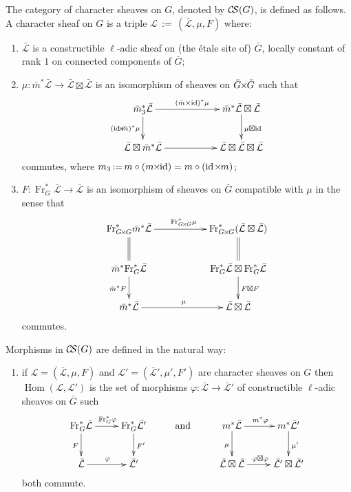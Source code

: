 \documentclass[11pt]{amsart}
\makeatletter
\theoremstyle{plain}
\theoremstyle{definition}
\theoremstyle{remark}
\newcommand{\Frob}{{\operatorname{Fr}}}
\DeclareMathOperator{\Hom}{Hom}
\DeclareMathOperator{\id}{id}
\newcommand{\cdef}[1]{{{\color{cyan}#1}\index{#1}}}
\newcommand{\ceq}{{\, :=\, }}
\newcommand{\cs}[1]{{\mathcal{#1}}}
\newcommand{\gcs}[1]{{\mathcal{\bar #1}}}
\newcommand{\CS}{{\mathcal{C\hskip-1.8pt S}}}
\newcommand{\labitem}[2]{%
\def\@itemlabel{\textbf{#1}}
\item
\def\@currentlabel{#1}\label{#2}}
\newcommand{\tighttimes}{\hskip-1pt\times\hskip-1pt}
\newcommand{\tightertimes}{\hskip-3pt\times\hskip-3pt}
\makeatother
\begin{document}
The category of character sheaves on $G$, denoted by \cdef{$\CS(G)$}, is defined as follows.
A \cdef{character sheaf} on $G$ is a triple $\cs{L}\ceq (\gcs{L},\mu,F)$ where: 
\begin{enumerate}
\labitem{(CS.0)}{CS.0} $\gcs{L}$ is a constructible $\ell$-adic sheaf on (the \'etale site of) ${\bar G}$, locally constant of rank $1$ on connected components of ${\bar G}$; 
\labitem{(CS.1)}{CS.1} $\mu: {\bar m}^* \gcs{L} \to  \gcs{L}\boxtimes \gcs{L}$ is an isomorphism of sheaves on ${\bar G}\tightertimes {\bar G}$ such that
\[
\xymatrix{
{\bar m}_3^*\gcs{L} \ar[rr]^{({\bar m}\times \id)^*\mu} \ar[d]_{(\id\tightertimes {\bar m})^*\mu}   &&  {\bar m}^*\gcs{L}\boxtimes \gcs{L} \ar[d]^{\mu \boxtimes \id} \\
\gcs{L} \boxtimes {\bar m}^* \gcs{L} \ar[rr] & &  \gcs{L} \boxtimes\gcs{L} \boxtimes \gcs{L}\\
}
\]
commutes, where $m_3 \ceq m\circ (m\tightertimes\id) = m\circ (\id\tighttimes m)$;
\labitem{(CS.2)}{CS.2} $F : \Frob_{G}^* \gcs{L} \to \gcs{L}$ is an isomorphism of sheaves on ${\bar G}$ compatible with $\mu$ in the sense that 
\[
\xymatrix{
\Frob_{G\tighttimes G}^* {\bar m}^* \gcs{L} \ar[rr]^{\Frob_{G\tighttimes G}^*\mu} && \Frob_{G\tighttimes G}^*(\gcs{L}\boxtimes \gcs{L})\\
\ar@{=}[u] {\bar m}^*  \Frob_{G}^* \gcs{L} \ar[d]_{{\bar m}^* F} && \ar[d]^{F\boxtimes F} \ar@{=}[u] \Frob_{G}^*\gcs{L}\boxtimes \Frob_{G}^*\gcs{L}\\
{\bar m}^*\gcs{L} \ar[rr]^{\mu} && \gcs{L} \boxtimes\gcs{L}\\
}
\]
commutes.
\end{enumerate}
Morphisms in $\CS(G)$ are defined in the natural way:
\begin{enumerate}
\labitem{(CS.3)}{CS.3} if $\cs{L} = (\gcs{L},\mu,F)$ and $\cs{L'} = (\gcs{L'},\mu',F')$ are character sheaves on $G$ then $\Hom(\cs{L},\cs{L'})$ is the set of morphisms $\varphi : \gcs{L} \to \gcs{L'}$ of constructible $\ell$-adic sheaves on ${\bar G}$ such
\[
\xymatrix{
\ar[d]_{F} \Frob_G^* \gcs{L} \ar[r]^{\Frob_G^* \varphi} & \ar[d]^{F'} \Frob_G^* \gcs{L'} &\text{and}& \ar[d]_{\mu} m^* \gcs{L} \ar[r]^{m^* \varphi} & \ar[d]^{\mu'} m^* \gcs{L'} \\
\gcs{L} \ar[r]^{\varphi} & \gcs{L'} && \gcs{L}\boxtimes\gcs{L} \ar[r]^{\varphi\boxtimes \varphi} & \gcs{L'} \boxtimes \gcs{L'}\\
}
\]
both commute.
\end{enumerate} 

\end{document}
